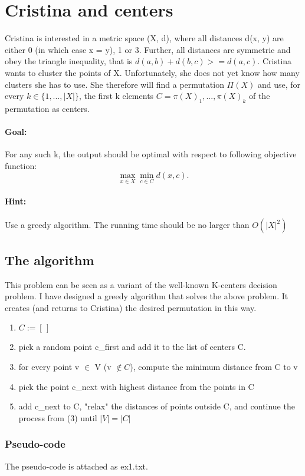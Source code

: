 \section{Cristina and centers}
Cristina is interested in a metric space (X, d), where all distances d(x, y) are
either 0 (in which case x = y), 1 or 3. Further, all distances are symmetric and obey the triangle inequality, that is $d(a, b) + d(b, c) >= d(a, c)$. Cristina wants to cluster the points of X. Unfortunately, she does not yet know how many clusters she has to use. She therefore will find a permutation $\Pi(X)$ and use, for every $k \in \{1, ..., |X|\}$, the first k elements $C =
{\pi(X)_1, ..., \pi(X)_k}$ of the permutation as centers.
\paragraph*{Goal:} For any such k, the output should be optimal with respect to following objective function:
\begin{equation}
\max_{x \in X} \min_{c \in C} d(x,c).
\end{equation}
\paragraph*{Hint:} Use a greedy algorithm. The running time should be no larger than $O(|X|^2)$

\subsection{The algorithm}
This problem can be seen as a variant of the well-known \cite{K-center} K-centers decision problem. I have designed a greedy algorithm that solves the above problem.
It creates (and returns to Cristina) the desired permutation in this way.
\begin{enumerate}
	\item $C:= [\,]$
	\item pick a random point c\_first and add it to the list of centers C.
	\item for every point v $\in$ V (v $\notin C$), compute the minimum distance from C to v 
	\item pick the point c\_next with highest distance from the points in C
	\item add c\_next to C, "relax" the distances of points outside C, and continue the process from (3) until $|V| = |C|$
\end{enumerate}

\subsubsection{Pseudo-code}
The pseudo-code is attached as ex1.txt.

